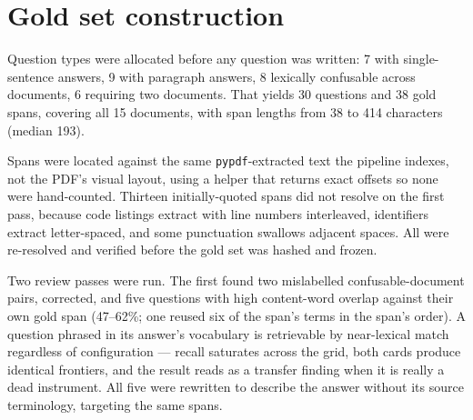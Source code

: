 \section{Gold set construction}
\label{app:gold}

Question types were allocated before any question was written: 7 with
single-sentence answers, 9 with paragraph answers, 8 lexically confusable across
documents, 6 requiring two documents. That yields 30 questions and 38 gold
spans, covering all 15 documents, with span lengths from 38 to 414 characters
(median 193).

Spans were located against the same \texttt{pypdf}-extracted text the pipeline
indexes, not the PDF's visual layout, using a helper that returns exact offsets
so none were hand-counted. Thirteen initially-quoted spans did not resolve on
the first pass, because code listings extract with line numbers interleaved,
identifiers extract letter-spaced, and some punctuation swallows adjacent
spaces. All were re-resolved and verified before the gold set was hashed and
frozen.

Two review passes were run. The first found two mislabelled
confusable-document pairs, corrected, and five questions with high content-word
overlap against their own gold span (47--62\%; one reused six of the span's
terms in the span's order). A question phrased in its answer's vocabulary is
retrievable by near-lexical match regardless of configuration --- recall
saturates across the grid, both cards produce identical frontiers, and the
result reads as a transfer finding when it is really a dead instrument. All five
were rewritten to describe the answer without its source terminology, targeting
the same spans.





